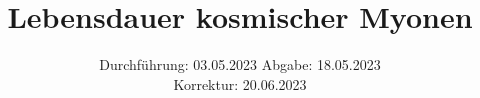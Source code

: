 

\subject{VERSUCH 01}
\title{Lebensdauer kosmischer Myonen}
\date{
  Durchführung: 03.05.2023
  \hspace{3em}
  Abgabe: 18.05.2023 \\
  
  Korrektur: 20.06.2023
}



\maketitle
\thispagestyle{empty}
\newpage









\newpage
\printbibliography{}

\newpage


% 

